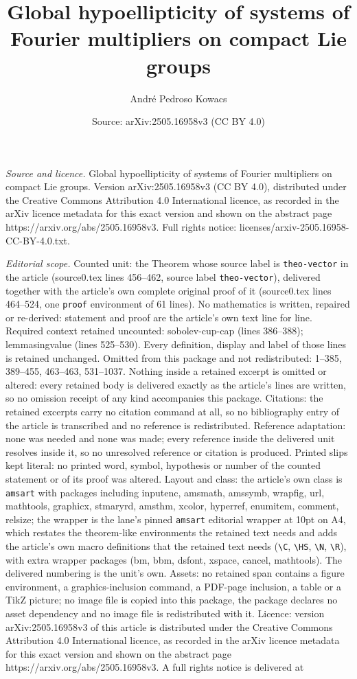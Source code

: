 \documentclass[10pt,a4paper]{amsart}
\title[Global hypoellipticity of systems of Fourier multipliers on ]{Global hypoellipticity of systems of Fourier multipliers on compact Lie groups}
\author{Andr\'e Pedroso Kowacs}
\date{Source: arXiv:2505.16958v3 (CC BY 4.0)}
\begin{document}
\maketitle

\noindent\emph{Source and licence.} Global hypoellipticity of systems of Fourier multipliers on compact Lie groups. Version arXiv:2505.16958v3 (CC BY 4.0), distributed under the Creative Commons Attribution 4.0 International licence, as recorded in the arXiv licence metadata for this exact version and shown on the abstract page https://arxiv.org/abs/2505.16958v3. Full rights notice: licenses/arxiv-2505.16958-CC-BY-4.0.txt.\par\smallskip

\noindent\textit{Editorial scope.} Counted unit: the Theorem whose source label is \texttt{theo-vector} in the article (source0.tex lines 456--462, source label \texttt{theo-vector}), delivered together with the article's own complete original proof of it (source0.tex lines 464--524, one \texttt{proof} environment of 61 lines). No mathematics is written, repaired or re-derived: statement and proof are the article's own text line for line. Required context retained uncounted: sobolev-cup-cap (lines 386--388); lemmasingvalue (lines 525--530). Every definition, display and label of those lines is retained unchanged. Omitted from this package and not redistributed: 1--385, 389--455, 463--463, 531--1037. Nothing inside a retained excerpt is omitted or altered: every retained body is delivered exactly as the article's lines are written, so no omission receipt of any kind accompanies this package. Citations: the retained excerpts carry no citation command at all, so no bibliography entry of the article is transcribed and no reference is redistributed. Reference adaptation: none was needed and none was made; every reference inside the delivered unit resolves inside it, so no unresolved reference or citation is produced. Printed slips kept literal: no printed word, symbol, hypothesis or number of the counted statement or of its proof was altered. Layout and class: the article's own class is \texttt{amsart} with packages including inputenc, amsmath, amssymb, wrapfig, url, mathtools, graphicx, stmaryrd, amsthm, xcolor, hyperref, enumitem, comment, relsize; the wrapper is the lane's pinned \texttt{amsart} editorial wrapper at 10pt on A4, which restates the theorem-like environments the retained text needs and adds the article's own macro definitions that the retained text needs (\texttt{\textbackslash C}, \texttt{\textbackslash HS}, \texttt{\textbackslash N}, \texttt{\textbackslash R}), with extra wrapper packages (bm, bbm, dsfont, xspace, cancel, mathtools). The delivered numbering is the unit's own. Assets: no retained span contains a figure environment, a graphics-inclusion command, a PDF-page inclusion, a table or a TikZ picture; no image file is copied into this package, the package declares no asset dependency and no image file is redistributed with it. Licence: version arXiv:2505.16958v3 of this article is distributed under the Creative Commons Attribution 4.0 International licence, as recorded in the arXiv licence metadata for this exact version and shown on the abstract page https://arxiv.org/abs/2505.16958v3. A full rights notice is delivered at 
\end{document}
